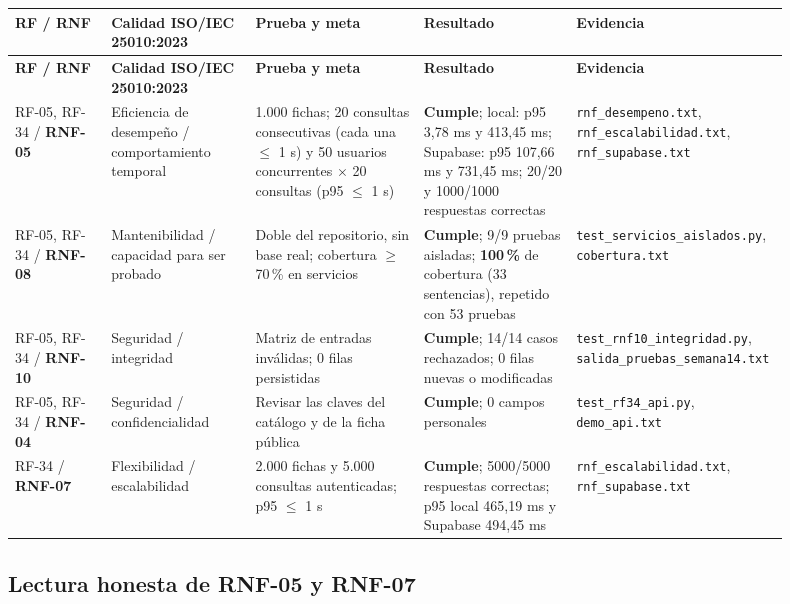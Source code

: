\documentclass[11pt,a4paper]{article}
\newcommand{\code}[1]{\texttt{#1}}
\newcommand{\thead}[1]{\textbf{#1}}
\begin{document}
{\footnotesize
\begin{longtable}{@{}A{0.12\linewidth}L{0.18\linewidth}L{0.21\linewidth}L{0.19\linewidth}L{0.20\linewidth}@{}}
\toprule
\thead{RF / RNF} & \thead{Calidad ISO/IEC 25010:2023} & \thead{Prueba y meta} &
\thead{Resultado} & \thead{Evidencia} \\ \midrule \endfirsthead
\thead{RF / RNF} & \thead{Calidad ISO/IEC 25010:2023} & \thead{Prueba y meta} &
\thead{Resultado} & \thead{Evidencia} \\ \midrule \endhead
\bottomrule
\endlastfoot
RF-05, RF-34 / \textbf{RNF-05} & Eficiencia de desempeño / comportamiento
temporal & 1.000 fichas; 20 consultas consecutivas (cada una $\leq$ 1 s) y
50 usuarios concurrentes $\times$ 20 consultas (p95 $\leq$ 1 s) &
\textbf{Cumple}; local: p95 3,78 ms y 413,45 ms; Supabase: p95 107,66 ms y
731,45 ms; 20/20 y 1000/1000 respuestas correctas &
\code{rnf\_desempeno.txt}, \code{rnf\_escalabilidad.txt},
\code{rnf\_supabase.txt} \\
RF-05, RF-34 / \textbf{RNF-08} & Mantenibilidad / capacidad para ser probado &
Doble del repositorio, sin base real; cobertura $\geq$ 70\,\% en servicios &
\textbf{Cumple}; 9/9 pruebas aisladas; \textbf{100\,\%} de cobertura (33
sentencias), repetido con 53 pruebas &
\code{test\_servicios\_aislados.py}, \code{cobertura.txt} \\
RF-05, RF-34 / \textbf{RNF-10} & Seguridad / integridad & Matriz de entradas
inválidas; 0 filas persistidas & \textbf{Cumple}; 14/14 casos rechazados; 0
filas nuevas o modificadas & \code{test\_rnf10\_integridad.py},
\code{salida\_pruebas\_semana14.txt} \\
RF-05, RF-34 / \textbf{RNF-04} & Seguridad / confidencialidad & Revisar las
claves del catálogo y de la ficha pública & \textbf{Cumple}; 0 campos
personales & \code{test\_rf34\_api.py}, \code{demo\_api.txt} \\
RF-34 / \textbf{RNF-07} & Flexibilidad / escalabilidad & 2.000 fichas y 5.000
consultas autenticadas; p95 $\leq$ 1 s &
\textbf{Cumple}; 5000/5000 respuestas correctas; p95 local 465,19 ms y
Supabase 494,45 ms &
\code{rnf\_escalabilidad.txt}, \code{rnf\_supabase.txt} \\
\end{longtable}
}

\subsection{Lectura honesta de RNF-05 y RNF-07}
\end{document}
